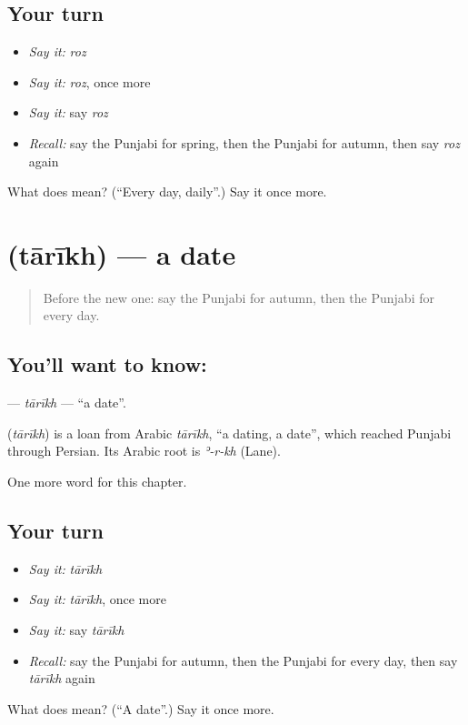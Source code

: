 \subsection*{Your turn}
\begin{itemize}
\raggedright
  \item \emph{Say it:} \emph{roz}
  \item \emph{Say it:} \emph{roz}, once more
  \item \emph{Say it:} say \emph{roz}
  \item \emph{Recall:} say the Punjabi for spring, then the Punjabi for autumn, then say \emph{roz} again
\end{itemize}

\begin{tcolorbox}[breakable,colback=teal!4,colframe=teal!35!black,title={Before you move on}]
What does  mean? (\textquotedblleft{}Every day, daily\textquotedblright{}.) Say it once more.
\end{tcolorbox}
\section[\texorpdfstring{\pa{ਤਾਰੀਖ਼} (tārīkh)}{ਤਾਰੀਖ਼ (tārīkh)}]{ (tārīkh) — a date}

\label{lesson:PA-C100-tarikh}



\begin{quote}
Before the new one: say the Punjabi for autumn, then the Punjabi for every day.
\end{quote}

\subsection*{You'll want to know: }
\textbf{} — \emph{tārīkh} — \textquotedblleft{}a date\textquotedblright{}.

\begin{cousinweb}
\textbf{} (\emph{tārīkh}) is a loan from Arabic \emph{tārīkh}, \textquotedblleft{}a dating, a date\textquotedblright{}, which reached Punjabi through Persian. Its Arabic root is \emph{ʾ-r-kh} (Lane).
\end{cousinweb}

\begin{grammarlens}[title={What you've built}]
One more word for this chapter.
\end{grammarlens}

\subsection*{Your turn}
\begin{itemize}
\raggedright
  \item \emph{Say it:} \emph{tārīkh}
  \item \emph{Say it:} \emph{tārīkh}, once more
  \item \emph{Say it:} say \emph{tārīkh}
  \item \emph{Recall:} say the Punjabi for autumn, then the Punjabi for every day, then say \emph{tārīkh} again
\end{itemize}

\begin{tcolorbox}[breakable,colback=teal!4,colframe=teal!35!black,title={Before you move on}]
What does  mean? (\textquotedblleft{}A date\textquotedblright{}.) Say it once more.
\end{tcolorbox}
